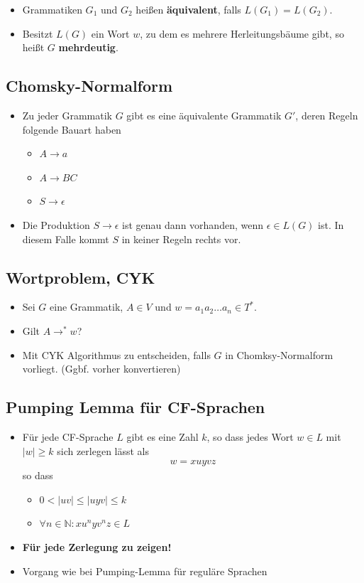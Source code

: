 \documentclass{scrartcl}
\begin{document}
\begin{itemize}
	\item Grammatiken $G_1$ und $G_2$ heißen \textbf{äquivalent}, falls $L(G_1) = L(G_2)$.
	\item Besitzt $L(G)$ ein Wort $w$, zu dem es mehrere Herleitungsbäume gibt, so heißt $G$ \textbf{mehrdeutig}.
\end{itemize}

\subsection{Chomsky-Normalform}

\begin{itemize}
	\item Zu jeder Grammatik $G$ gibt es eine äquivalente Grammatik $G'$, deren Regeln folgende Bauart haben
	\begin{itemize}
		\item $A \rightarrow a$
		\item $A \rightarrow BC$
		\item $S \rightarrow \epsilon$
	\end{itemize}
	\item Die Produktion $S \rightarrow \epsilon$ ist genau dann vorhanden, wenn $\epsilon \in L(G)$ ist. In diesem Falle kommt $S$ in keiner Regeln rechts vor.
\end{itemize}

\subsection{Wortproblem, CYK}

\begin{itemize}
	\item Sei $G$ eine Grammatik, $A \in V$ und $w = a_1 a_2 \ldots a_n \in T^*$.
	\item Gilt $A \rightarrow^* w$?
	\item Mit CYK Algorithmus zu entscheiden, falls $G$ in Chomksy-Normalform vorliegt. (Ggbf. vorher konvertieren)
\end{itemize}

\subsection{Pumping Lemma für CF-Sprachen}

\begin{itemize}
 \item Für jede CF-Sprache $L$ gibt es eine Zahl $k$, so dass jedes Wort $w \in L$ mit $|w| \geq k$ sich zerlegen lässt als
 \begin{align*}
 	w = x u y v z
 \end{align*}
 so dass
 \begin{itemize}
 	\item $0 < |uv| \leq |uyv| \leq k$
 	\item $\forall n \in \mathbb{N}: x u^n y v^n z \in L$
 \end{itemize}
 \item \textbf{Für jede Zerlegung zu zeigen!}
 \item Vorgang wie bei Pumping-Lemma für reguläre Sprachen
\end{itemize}
\end{document}
